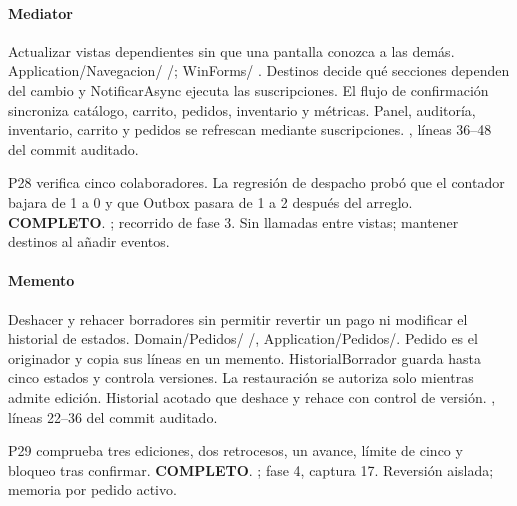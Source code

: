 \paragraph{Mediator}
 Actualizar vistas dependientes sin que una pantalla conozca a las demás.
 Application/Navegacion/ /; WinForms/ . Destinos decide qué secciones dependen del cambio y NotificarAsync ejecuta las suscripciones. El flujo de confirmación sincroniza catálogo, carrito, pedidos, inventario y métricas.
 Panel, auditoría, inventario, carrito y pedidos se refrescan mediante suscripciones.
 , líneas 36--48 del commit auditado.

 P28 verifica cinco colaboradores. La regresión de despacho probó que el contador bajara de 1 a 0 y que Outbox pasara de 1 a 2 después del arreglo. \textbf{COMPLETO}.
 ; recorrido de fase 3.
 Sin llamadas entre vistas; mantener destinos al añadir eventos.
\medskip
\clearpage
\paragraph{Memento}
 Deshacer y rehacer borradores sin permitir revertir un pago ni modificar el historial de estados.
 Domain/Pedidos/ /, Application/Pedidos/. Pedido es el originador y copia sus líneas en un memento. HistorialBorrador guarda hasta cinco estados y controla versiones. La restauración se autoriza solo mientras admite edición.
 Historial acotado que deshace y rehace con control de versión.
 , líneas 22--36 del commit auditado.

 P29 comprueba tres ediciones, dos retrocesos, un avance, límite de cinco y bloqueo tras confirmar. \textbf{COMPLETO}.
 ; fase 4, captura 17.
 Reversión aislada; memoria por pedido activo.
\medskip
\clearpage
